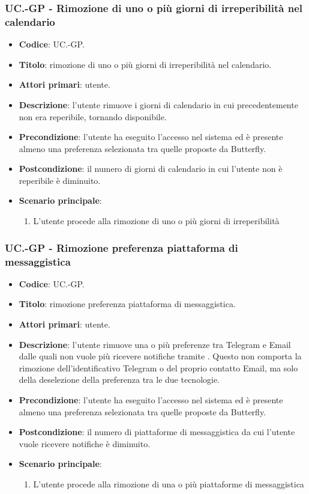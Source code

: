 	\subsubsection{UC\theuccount.\thesubuccount-GP - Rimozione di uno o più giorni di irreperibilità nel calendario}
	\begin{itemize}
		\item \textbf{Codice}: UC\theuccount.\thesubuccount-GP.
		\item \textbf{Titolo}: rimozione di uno o più giorni di irreperibilità nel calendario.
		\item \textbf{Attori primari}: utente.
		\item \textbf{Descrizione}: l’utente rimuove i giorni di calendario in cui precedentemente	non era reperibile, tornando disponibile.
		\item \textbf{Precondizione}: l’utente ha eseguito l'accesso nel sistema ed è presente almeno
        una preferenza selezionata tra quelle proposte da Butterfly.
		\item \textbf{Postcondizione}: il numero di giorni di calendario in cui l’utente non è reperibile è diminuito.
		\item \textbf{Scenario principale}:
		\begin{enumerate}
			\item L'utente procede alla rimozione di uno o più giorni di irreperibilità
		\end{enumerate}
	\end{itemize}

	\subsubsection{UC\theuccount.\thesubuccount-GP - Rimozione preferenza piattaforma di messaggistica}
	\begin{itemize}
		\item \textbf{Codice}: UC\theuccount.\thesubuccount-GP.
		\item \textbf{Titolo}: rimozione preferenza piattaforma di messaggistica.
		\item \textbf{Attori primari}: utente.
		\item \textbf{Descrizione}: l’utente rimuove una o più preferenze tra Telegram e Email dalle	quali non vuole più ricevere notifiche tramite \progetto.
		Questo non comporta la rimozione dell'identificativo Telegram o del proprio contatto Email, ma solo della deselezione della preferenza tra le due tecnologie.
		\item \textbf{Precondizione}: l’utente ha eseguito l'accesso nel sistema ed è presente almeno
        una preferenza selezionata tra quelle proposte da Butterfly.
		\item \textbf{Postcondizione}: il numero di piattaforme di messaggistica da cui l’utente vuole ricevere notifiche è diminuito.
		\item \textbf{Scenario principale}:
		\begin{enumerate}
			\item L'utente procede alla rimozione di una o più piattaforme di messaggistica
		\end{enumerate}
	\end{itemize}

